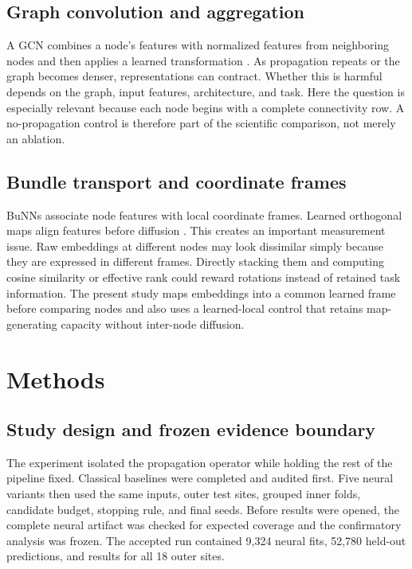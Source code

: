 \documentclass[11pt,a4paper]{article}
\begin{document}
\subsection{Graph convolution and aggregation}

A GCN combines a node's features with normalized features from neighboring
nodes and then applies a learned transformation \cite{kipf2017gcn}. As
propagation repeats or the graph becomes denser, representations can contract.
Whether this is harmful depends on the graph, input features, architecture,
and task. Here the question is especially relevant because each node begins
with a complete connectivity row. A no-propagation control is therefore part
of the scientific comparison, not merely an ablation.

\subsection{Bundle transport and coordinate frames}

BuNNs associate node features with local coordinate frames. Learned
orthogonal maps align features before diffusion \cite{bamberger2025bundle}.
This creates an important measurement issue. Raw embeddings at different
nodes may look dissimilar simply because they are expressed in different
frames. Directly stacking them and computing cosine similarity or effective
rank could reward rotations instead of retained task information. The present
study maps embeddings into a common learned frame before comparing nodes and
also uses a learned-local control that retains map-generating capacity without
inter-node diffusion.

\section{Methods}

\subsection{Study design and frozen evidence boundary}

The experiment isolated the propagation operator while holding the rest of
the pipeline fixed. Classical baselines were completed and audited first. Five
neural variants then used the same inputs, outer test sites, grouped inner
folds, candidate budget, stopping rule, and final seeds. Before results were
opened, the complete neural artifact was checked for expected coverage and the
confirmatory analysis was frozen. The accepted run contained 9,324 neural
fits, 52,780 held-out predictions, and results for all 18 outer sites.
\end{document}
